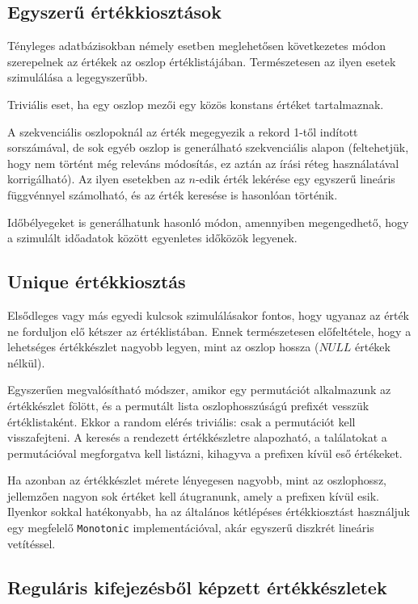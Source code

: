 \documentclass[
    parspace,
    noindent,
    nohyp,
]{elteiktdk}[2023/04/10]
\begin{document}
\subsection{Egyszerű értékkiosztások}

Tényleges adatbázisokban némely esetben meglehetősen következetes módon
szerepelnek az értékek az oszlop értéklistájában.
Természetesen az ilyen esetek szimulálása a legegyszerűbb.

Triviális eset, ha egy oszlop mezői egy közös konstans értéket tartalmaznak.

A szekvenciális oszlopoknál az érték megegyezik a rekord 1-től indított sorszámával,
de sok egyéb oszlop is generálható szekvenciális alapon
(feltehetjük, hogy nem történt még releváns módosítás,
ez aztán az írási réteg használatával korrigálható).
Az ilyen esetekben az $n$-edik érték lekérése
egy egyszerű lineáris függvénnyel számolható,
és az érték keresése is hasonlóan történik.

Időbélyegeket is generálhatunk hasonló módon,
amennyiben megengedhető, hogy a szimulált időadatok között egyenletes időközök legyenek.

\subsection{Unique értékkiosztás}

Elsődleges vagy más egyedi kulcsok szimulálásakor fontos,
hogy ugyanaz az érték ne forduljon elő kétszer az értéklistában.
Ennek természetesen előfeltétele,
hogy a lehetséges értékkészlet nagyobb legyen, mint az oszlop hossza
($NULL$ értékek nélkül).

Egyszerűen megvalósítható módszer,
amikor egy permutációt alkalmazunk az értékkészlet fölött,
és a permutált lista oszlophosszúságú prefixét vesszük értéklistaként.
Ekkor a random elérés triviális: csak a permutációt kell visszafejteni.
A keresés a rendezett értékkészletre alapozható,
a találatokat a permutációval megforgatva kell listázni,
kihagyva a prefixen kívül eső értékeket.

Ha azonban az értékkészlet mérete lényegesen nagyobb, mint az oszlophossz,
jellemzően nagyon sok értéket kell átugranunk, amely a prefixen kívül esik.
Ilyenkor sokkal hatékonyabb,
ha az általános kétlépéses értékkiosztást használjuk
egy megfelelő \texttt{Monotonic} implementációval,
akár egyszerű diszkrét lineáris vetítéssel.


\subsection{Reguláris kifejezésből képzett értékkészletek}
\end{document}
